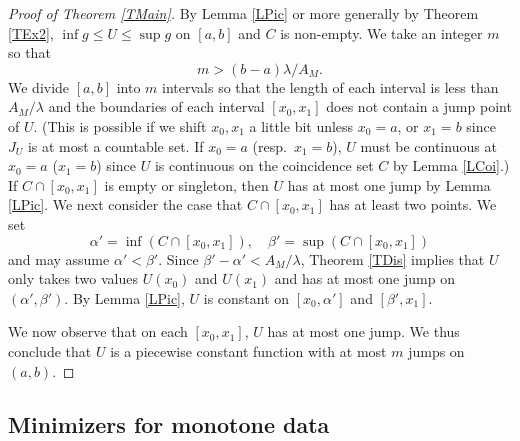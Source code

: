 \documentclass[11pt]{amsart} %
\numberwithin{equation}{section}
\begin{document}
\begin{proof}[Proof of Theorem \ref{TMain}]
By Lemma \ref{LPic} or more generally by Theorem \ref{TEx2}, $\inf g\leq U\leq\sup g$ on $[a,b]$ and $C$ is non-empty.
 We take an integer $m$ so that
\[
	m > (b-a)\lambda /A_M.
\]
We divide $[a,b]$ into $m$ intervals so that the length of each interval is less than $A_M/\lambda$ and the boundaries of each interval $[x_0,x_1]$ does not contain a jump point of $U$.
 (This is possible if we shift $x_0,x_1$ a little bit unless $x_0=a$, or $x_1=b$ since $J_U$ is at most a countable set.
 If $x_0=a$ (resp.\ $x_1=b$), $U$ must be continuous at $x_0=a$ ($x_1=b$) since $U$ is continuous on the coincidence set $C$ by Lemma \ref{LCoi}.) 
 If $C\cap[x_0,x_1]$ is empty or singleton, then $U$ has at most one jump by Lemma \ref{LPic}.
 We next consider the case that $C\cap[x_0,x_1]$ has at least two points.
 We set
\[
	\alpha' = \inf \left( C\cap[x_0,x_1] \right), \quad
	\beta' = \sup \left( C\cap[x_0,x_1] \right)
\]
and may assume $\alpha'<\beta'$.
 Since $\beta'-\alpha'<A_M/\lambda$, Theorem \ref{TDis} implies that $U$ only takes two values $U(x_0)$ and $U(x_1)$ and has at most one jump on $(\alpha',\beta')$.
 By Lemma \ref{LPic}, $U$ is constant on $[x_0,\alpha']$ and $[\beta',x_1]$.

% 
%
 We now observe that on each $[x_0,x_1]$, $U$ has at most one jump.
 We thus conclude that $U$ is a piecewise constant function with at most $m$ jumps on $(a,b)$.
\end{proof}

\subsection{Minimizers for monotone data} \label{SSMo}
\end{document}
